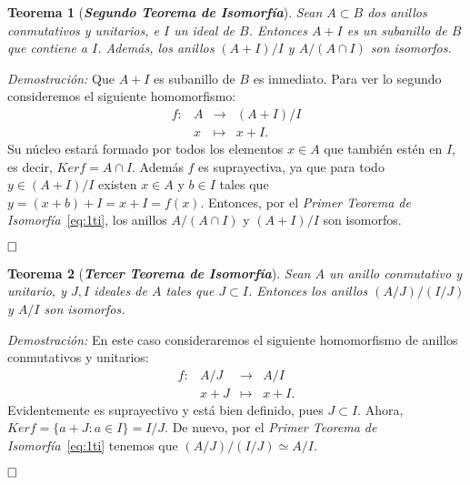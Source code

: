 \documentclass[12pt]{article}
\newtheorem{theorem}{Teorema}[section]
\begin{document}
\begin{theorem}[\textbf{\textit{Segundo Teorema de Isomorfía}}]
Sean $A \subset B$ dos anillos conmutativos y unitarios, e $I$ un ideal de $B$. Entonces $A + I$ es un subanillo de $B$ que contiene a $I$. Además, los anillos $(A+ I)/I$ y $A/(A \cap I)$ son isomorfos.
\end{theorem}
\emph{Demostración: } Que $A + I$ es subanillo de $B$ es inmediato. Para ver lo segundo consideremos el siguiente homomorfismo: $$\begin{array}{rccl}
f \colon &A&\longrightarrow &(A + I)/I \\
&x& \longmapsto &x + I.
\end{array}
$$ Su núcleo estará formado por todos los elementos $x \in A$ que también estén en $I$, es decir, $Ker f = A \cap I$. Además $f$ es suprayectiva, ya que para todo $y \in (A+ I)/I$ existen $x \in A$ y $b \in I$ tales que $y = (x +b) + I = x + I = f(x)$. Entonces, por el \textit{Primer Teorema de Isomorfía}~\ref{eq:1ti}, los anillos $A/(A \cap I)$ y $(A+I)/I$ son isomorfos.

$\hfill \square$

\begin{theorem}[\textbf{\textit{Tercer Teorema de Isomorfía}}]
Sean $A$ un anillo conmutativo y unitario, y $J, I$ ideales de $A$ tales que $J \subset I$. Entonces los anillos $(A/J)/(I/J)$ y $A/I$ son isomorfos.
\end{theorem}
\emph{Demostración: }En este caso consideraremos el siguiente homomorfismo de anillos conmutativos y unitarios: $$\begin{array}{rccl}
f \colon &A/J&\longrightarrow &A/I \\
&x+ J& \longmapsto &x + I.
\end{array}
$$ Evidentemente es suprayectivo y está bien definido, pues $J \subset I$. Ahora, $Ker f = \lbrace a + J: a \in I \rbrace = I/J$. De nuevo, por el \textit{Primer Teorema de Isomorfía}~\ref{eq:1ti} tenemos que $(A/J)/(I/J) \simeq A/I$.

$\hfill \square$
\end{document}
